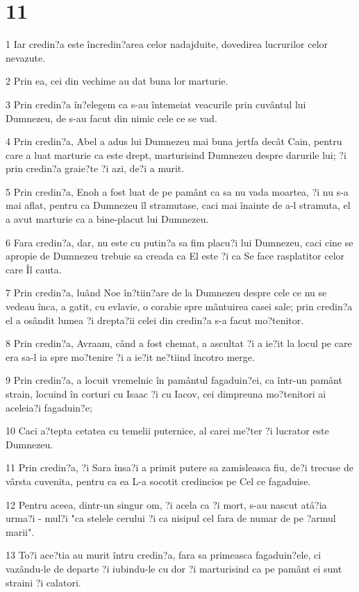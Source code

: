 \chapter{11}

\par 1 Iar credin?a este încredin?area celor nadajduite, dovedirea lucrurilor celor nevazute.
\par 2 Prin ea, cei din vechime au dat buna lor marturie.
\par 3 Prin credin?a în?elegem ca s-au întemeiat veacurile prin cuvântul lui Dumnezeu, de s-au facut din nimic cele ce se vad.
\par 4 Prin credin?a, Abel a adus lui Dumnezeu mai buna jertfa decât Cain, pentru care a luat marturie ca este drept, marturisind Dumnezeu despre darurile lui; ?i prin credin?a graie?te ?i azi, de?i a murit.
\par 5 Prin credin?a, Enoh a fost luat de pe pamânt ca sa nu vada moartea, ?i nu s-a mai aflat, pentru ca Dumnezeu îl stramutase, caci mai înainte de a-l stramuta, el a avut marturie ca a bine-placut lui Dumnezeu.
\par 6 Fara credin?a, dar, nu este cu putin?a sa fim placu?i lui Dumnezeu, caci cine se apropie de Dumnezeu trebuie sa creada ca El este ?i ca Se face rasplatitor celor care Îl cauta.
\par 7 Prin credin?a, luând Noe în?tiin?are de la Dumnezeu despre cele ce nu se vedeau înca, a gatit, cu evlavie, o corabie spre mântuirea casei sale; prin credin?a el a osândit lumea ?i drepta?ii celei din credin?a s-a facut mo?tenitor.
\par 8 Prin credin?a, Avraam, când a fost chemat, a ascultat ?i a ie?it la locul pe care era sa-l ia spre mo?tenire ?i a ie?it ne?tiind încotro merge.
\par 9 Prin credin?a, a locuit vremelnic în pamântul fagaduin?ei, ca într-un pamânt strain, locuind în corturi cu Isaac ?i cu Iacov, cei dimpreuna mo?tenitori ai aceleia?i fagaduin?e;
\par 10 Caci a?tepta cetatea cu temelii puternice, al carei me?ter ?i lucrator este Dumnezeu.
\par 11 Prin credin?a, ?i Sara însa?i a primit putere sa zamisleasca fiu, de?i trecuse de vârsta cuvenita, pentru ca ea L-a socotit credincios pe Cel ce fagaduise.
\par 12 Pentru aceea, dintr-un singur om, ?i acela ca ?i mort, s-au nascut atâ?ia urma?i - mul?i "ca stelele cerului ?i ca nisipul cel fara de numar de pe ?armul marii".
\par 13 To?i ace?tia au murit întru credin?a, fara sa primeasca fagaduin?ele, ci vazându-le de departe ?i iubindu-le cu dor ?i marturisind ca pe pamânt ei sunt straini ?i calatori.
